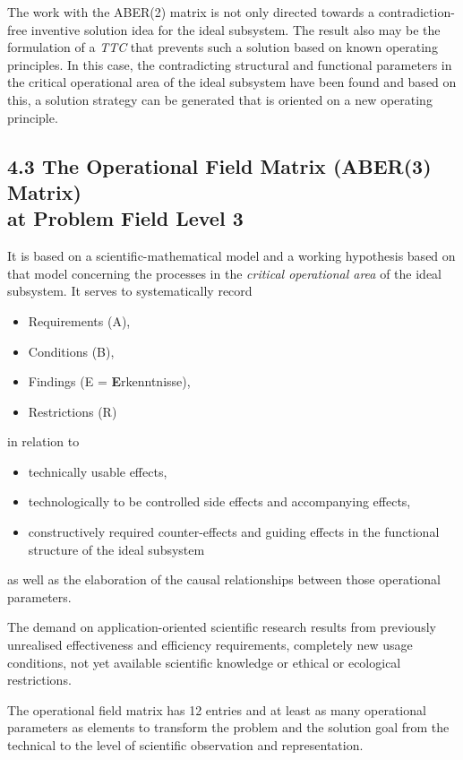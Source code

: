 \documentclass[12pt,a4paper]{article}
\begin{document}
The work with the ABER(2) matrix is not only directed towards a
contradiction-free inventive solution idea for the ideal subsystem. The result
also may be the formulation of a \emph{TTC} that prevents such a solution
based on known operating principles. In this case, the contradicting
structural and functional parameters in the critical operational area of the
ideal subsystem have been found and based on this, a solution strategy can be
generated that is oriented on a new operating principle.

\subsection*{4.3 The Operational Field Matrix (ABER(3) Matrix)\\ at Problem
  Field Level 3}

It is based on a scientific-mathematical model and a working hypothesis based
on that model concerning the processes in the \emph{critical operational area}
of the ideal subsystem. It serves to systematically record
\begin{itemize}
\item Requirements (A),
\item Conditions (B),
\item Findings (E = \textbf{E}rkenntnisse),
\item Restrictions (R)
\end{itemize}
\newpage
in relation to
\begin{itemize}
\item technically usable effects,
\item technologically to be controlled side effects and accompanying effects,
\item constructively required counter-effects and guiding effects in the
  functional structure of the ideal subsystem
\end{itemize}
as well as the elaboration of the causal relationships between those
operational parameters.

The demand on application-oriented scientific research results from previously
unrealised effectiveness and efficiency requirements, completely new usage
conditions, not yet available scientific knowledge or ethical or ecological
restrictions.

The operational field matrix has 12 entries and at least as many operational
parameters as elements to transform the problem and the solution goal from the
technical to the level of scientific observation and representation.
\end{document}
